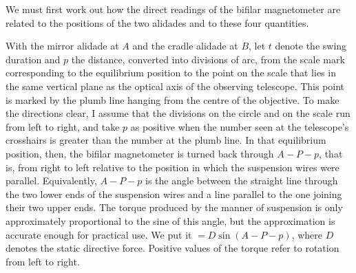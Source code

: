 We must first work out how the direct readings of the bifilar magnetometer are related to the positions of the two alidades and to these four quantities.

With the mirror alidade at $A$ and the cradle alidade at $B$, let $t$ denote the swing duration and $p$ the distance, converted into divisions of arc, from the scale mark corresponding to the equilibrium position to the point on the scale that lies in the same vertical plane as the optical axis of the observing telescope. This point is marked by the plumb line hanging from the centre of the objective. To make the directions clear, I assume that the divisions on the circle and on the scale run from left to right, and take $p$ as positive when the number seen at the telescope’s crosshairs is greater than the number at the plumb line. In that equilibrium position, then, the bifilar magnetometer is turned back through $A-P-p$, that is, from right to left relative to the position in which the suspension wires were parallel. Equivalently, $A-P-p$ is the angle between the straight line through the two lower ends of the suspension wires and a line parallel to the one joining their two upper ends. The torque produced by the manner of suspension is only approximately proportional to the sine of this angle, but the approximation is accurate enough for practical use. We put it $=D\sin(A-P-p)$, where $D$ denotes the static directive force. Positive values of the torque refer to rotation from left to right.

